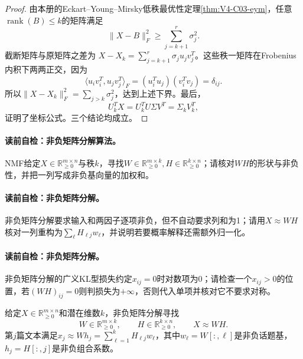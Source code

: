 \begin{proof}
由本册的Eckart--Young--Mirsky低秩最优性定理\ref{thm:V4-C03-eym}，任意$\operatorname{rank}(B)\le k$的矩阵满足
\[
\|X-B\|_F^2\ge\sum_{j=k+1}^{r}\sigma_j^2.
\]
截断矩阵与原矩阵之差为
$X-X_k=\sum_{j=k+1}^{r}\sigma_ju_jv_j^T$。这些秩一矩阵在Frobenius内积下两两正交，因为
\[
\langle u_iv_i^T,u_jv_j^T\rangle_F
=(u_i^Tu_j)(v_i^Tv_j)=\delta_{ij}.
\]
所以$\|X-X_k\|_F^2=\sum_{j>k}\sigma_j^2$，达到上述下界。最后，
\[
U_k^TX=U_k^TU\Sigma V^T=\Sigma_kV_k^T,
\]
证明了坐标公式。三个结论均成立。
\end{proof}

\paragraph{读前自检：非负矩阵分解算法。}NMF给定$X\in\mathbb R_{\ge0}^{m\times n}$与秩$k$，寻找$W\in\mathbb R_{\ge0}^{m\times k},H\in\mathbb R_{\ge0}^{k\times n}$；请核对$WH$的形状与非负性，并把一列写成非负基向量的加权和。\par
\paragraph{读前自检：非负矩阵分解。}非负矩阵分解要求输入和两因子逐项非负，但不自动要求列和为1；请用$X\approx WH$核对一列重构为$\sum_\ell H_{\ell j}w_\ell$，并说明若要概率解释还需额外归一化。\par

\paragraph{读前自检：非负矩阵分解。}非负矩阵分解的广义KL型损失约定$x_{ij}=0$时对数项为0；请检查一个$x_{ij}>0$的位置，若$(WH)_{ij}=0$则判损失为$+\infty$，否则代入单项并核对它不要求对称。\par

\begin{definition}[非负矩阵分解]\label{def:V4-C05-nmf}
给定$X\in\mathbb R_{\ge0}^{m\times n}$和潜在维数$k$，非负矩阵分解寻找
\[
W\in\mathbb R_{\ge0}^{m\times k},\qquad
H\in\mathbb R_{\ge0}^{k\times n},\qquad X\approx WH.
\]
第$j$篇文本满足$x_j\approx Wh_j=\sum_{\ell=1}^kH_{\ell j}w_\ell$，其中$w_\ell=W[:,\ell]$是非负话题基，$h_j=H[:,j]$是非负组合系数。
\end{definition}

